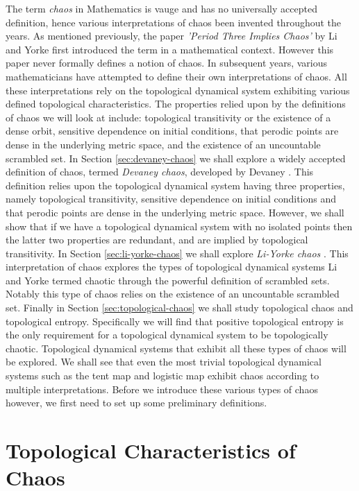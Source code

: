 The term \emph{chaos} in Mathematics is vauge and has no universally accepted definition, hence various interpretations of chaos been invented throughout the years. As mentioned previously, the paper \emph{'Period Three Implies Chaos'} by Li and Yorke \cite{li-yorke} first introduced the term in a mathematical context. However this paper never formally defines a notion of chaos. In subsequent years, various mathematicians have attempted to define their own interpretations of chaos. All these interpretations rely on the topological dynamical system exhibiting various defined topological characteristics. The properties relied upon by the definitions of chaos we will look at include: topological transitivity or the existence of a dense orbit, sensitive dependence on initial conditions, that perodic points are dense in the underlying metric space, and the existence of an uncountable scrambled set. In Section \ref{sec:devaney-chaos} we shall explore a widely accepted definition of chaos, termed \emph{Devaney chaos}, developed by Devaney \cite{devaney}. This definition relies upon the topological dynamical system having three properties, namely topological transitivity, sensitive dependence on initial conditions and that perodic points are dense in the underlying metric space. However, we shall show that if we have a topological dynamical system with no isolated points then the latter two properties are redundant, and are implied by topological transitivity. In Section \ref{sec:li-yorke-chaos} we shall explore \emph{Li-Yorke chaos} \cite{li-yorke}. This interpretation of chaos explores the types of topological dynamical systems Li and Yorke termed chaotic through the powerful definition of scrambled sets. Notably this type of chaos relies on the existence of an uncountable scrambled set. Finally in Section \ref{sec:topological-chaos} we shall study topological chaos and topological entropy. Specifically we will find that positive topological entropy is the only requirement for a topological dynamical system to be topologically chaotic. Topological dynamical systems that exhibit all these types of chaos will be explored. We shall see that even the most trivial topological dynamical systems such as the tent map and logistic map exhibit chaos according to multiple interpretations. Before we introduce these various types of chaos however, we first need to set up some preliminary definitions.

\section{Topological Characteristics of Chaos} \label{sec:characteristics-of-chaos}

